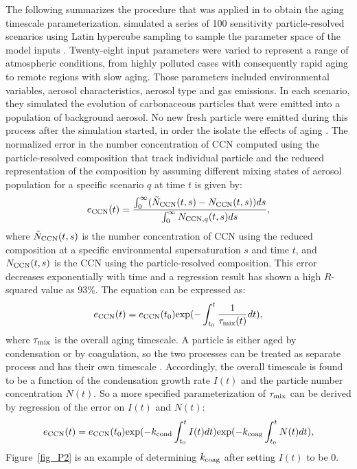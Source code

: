 \documentclass[12pt, fullpage]{uiucthesis2009_2}
\begin{document}
	The following summarizes the procedure that was applied in \citet{Fierce2016} to obtain the aging timescale parameterization. \citet{Fierce2016} simulated a series of 100 sensitivity particle-resolved scenarios using Latin hypercube sampling to sample the parameter space of the model inputs \citep{mckay1979comparison}. Twenty-eight input parameters were varied to represent a range of atmospheric conditions, from highly polluted cases with consequently rapid aging to remote regions with slow aging. Those parameters included environmental variables, aerosol characteristics, aerosol type and gas emissions. In each scenario, they simulated the evolution of carbonaceous particles that were emitted into a population of background aerosol. No new fresh particle were emitted during this process after the simulation started, in order the isolate the effects of aging \citep{Fierce2016}. The normalized error in the number concentration of CCN computed using the particle-resolved composition that track individual particle and the reduced representation of the composition by assuming different mixing states of aerosol population for a specific scenario $q$ at time $t$ is given by:
	\begin{align}\label{eq:11}
	e_{\rm CCN}(t) = \frac{\int_{0}^{\infty}( \tilde{N}_{\rm CCN}(t,s) - 
		N_{\rm CCN} (t,s))ds}{\int_{0}^{\infty} N_{\text{CCN}, q}(t,s)ds},
	\end{align}
	where $\tilde{N}_{\rm CCN}(t,s)$ is the number concentration of CCN using the reduced composition at a specific environmental supersaturation $s$ and time $t$, and $N_{\rm CCN}(t,s)$ is the CCN using the particle-resolved composition. This error decreases exponentially with time and a regression result has shown a high $R$-squared value as 93$\%$. The equation can be expressed as:
	\begin{align}
	e_{\rm CCN}(t) = e_{\rm CCN}(t_{0})\text{exp}(-\int_{t_{0}}^{t}\frac{1}{\tau_{\rm mix}(t)} dt), 
	\end{align}
	where $\tau_{\rm mix}$ is the overall aging timescale. 
	A particle is either aged by condensation or by coagulation, so the two processes can be treated as separate process and has their own timescale \citep{Fierce2015}. Accordingly, the overall timescale is found to be a function of the condensation growth rate $I(t)$ and the particle number concentration $N(t)$.
	So a more specified parameterization of $\tau_{\rm mix}$ can be derived by regression of the error on $I(t)$ and $N(t)$:
	\begin{align}
	e_{\rm CCN}(t) = e_{\rm CCN}(t_{0})\text{exp}(-k_{\rm cond}\int_{t_{0}}^{t} I(t) dt)\text{exp}(-k_{\rm coag}\int_{t_{0}}^{t}N(t) dt), 
	\end{align}
	Figure~\ref{fig_P2} is an example of determining $k_{\rm coag}$ after setting $I(t)$ to be 0. 
	
\end{document}
